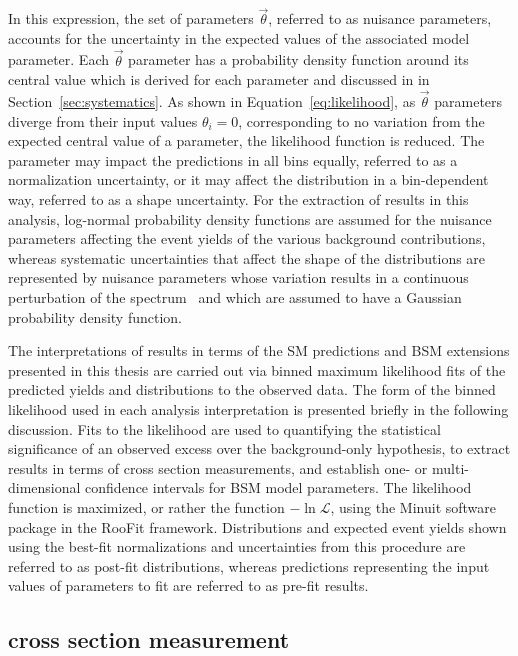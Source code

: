 In this expression, 
the set of parameters $\vec{\theta}$, referred to as nuisance parameters,
accounts for the uncertainty in the expected values of the associated model parameter.
Each $\vec{\theta}$ parameter has a probability density function around its
central value which is derived for each parameter and discussed in 
in Section~\ref{sec:systematics}.
As shown in Equation~\ref{eq:likelihood}, as $\vec{\theta}$ parameters diverge from
their input values $\theta_i = 0$, corresponding to no variation from the expected 
central value of a parameter, the likelihood function is reduced.
The parameter may impact the predictions in all bins equally,
referred to as a normalization uncertainty, or it may affect the distribution in
a bin-dependent way, referred to as a shape uncertainty.
For the extraction of results in this analysis, log-normal probability density functions are 
assumed for the nuisance parameters affecting 
the event yields of the various background contributions, whereas systematic uncertainties 
that affect the shape of the distributions are represented by nuisance parameters whose 
variation results in a continuous perturbation of the spectrum~\cite{Prosper:2011zz} and which are assumed 
to have a Gaussian probability density function.

The interpretations of results in terms of 
the SM predictions and BSM extensions presented in this thesis 
are carried out via binned maximum likelihood fits of the predicted yields and distributions
to the observed data. The form of the binned likelihood used in each
analysis interpretation is presented briefly in the following discussion.
Fits to the likelihood are used to 
quantifying the statistical significance of an observed excess over the background-only hypothesis, 
to extract results in terms of cross section measurements, and establish
one- or multi-dimensional confidence intervals for BSM model parameters.
The likelihood function is maximized, or rather the function $-\ln \mathcal{L}$,
using the {\sc Minuit} software package in the {\sc RooFit} framework. Distributions 
and expected event yields
shown using the best-fit normalizations and uncertainties from this procedure
are referred to as post-fit distributions, whereas predictions
representing the input values of parameters to fit are referred to as pre-fit results.

\subsection{\WZjj cross section measurement}

